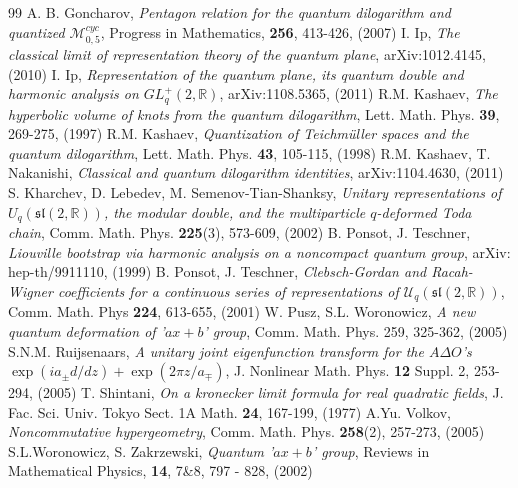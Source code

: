 \documentclass[10pt,reqno]{article}
\newcommand{\D}{\mathrm{D}}
\def\R{\mathbb{R}}
\def\cM{\mathcal{M}}
\def\cU{\mathcal{U}}
\def\D{\Delta}
\def\sl{\mathfrak{sl}}
\numberwithin{equation}{section}
\begin{document}
\begin{thebibliography}{99}
  A. B. Goncharov,
\textit{Pentagon relation for the quantum dilogarithm and quantized $\cM_{0,5}^{cyc}$},
Progress in Mathematics, \textbf{256}, 413-426, (2007)
  I. Ip,
  \textit{The classical limit of representation theory of the quantum plane},
   arXiv:1012.4145, (2010)
  I. Ip,
  \textit{Representation of the quantum plane, its quantum double and harmonic analysis on $GL_q^+(2,\R)$},
   arXiv:1108.5365, (2011) 
  R.M. Kashaev,
  \textit{The hyperbolic volume of knots from the quantum dilogarithm},
  Lett. Math. Phys. \textbf{39}, 269-275,  (1997)
  R.M. Kashaev,
  \textit{Quantization of Teichm\"{u}ller spaces and the quantum dilogarithm},
  Lett. Math. Phys. \textbf{43}, 105-115, (1998)
  R.M. Kashaev, T. Nakanishi,
 \textit{Classical and quantum dilogarithm identities},
 arXiv:1104.4630, (2011)
  S. Kharchev, D. Lebedev, M. Semenov-Tian-Shanksy,
  \textit{Unitary representations of $U_q(\sl(2,\R))$, the modular double, and the multiparticle $q$-deformed Toda chain},
  Comm. Math. Phys. \textbf{225}(3), 573-609, (2002)
  B. Ponsot, J. Teschner,
  \textit{Liouville bootstrap via harmonic analysis on a noncompact quantum group},
  arXiv: hep-th/9911110, (1999)
  B. Ponsot, J. Teschner,
  \textit{Clebsch-Gordan and Racah-Wigner coefficients for a continuous series of representations of $\cU_q(\mathfrak{sl}(2,\R))$},
  Comm. Math. Phys \textbf{224}, 613-655, (2001)
  W. Pusz, S.L. Woronowicz,
  \textit{A new quantum deformation of '$ax+b$' group},
  Comm. Math. Phys. 259, 325-362, (2005)
  S.N.M. Ruijsenaars,
  \textit{A unitary joint eigenfunction transform for the $A\D O$'s $\exp(ia_\pm d/dz)+\exp(2\pi z/a_\mp)$},
  J. Nonlinear Math. Phys. \textbf{12} Suppl. 2, 253-294, (2005)
  T. Shintani,
  \textit{On a kronecker limit formula for real quadratic fields},
J. Fac. Sci. Univ. Tokyo Sect. 1A Math. \textbf{24}, 167-199, (1977)
  A.Yu. Volkov,
  \textit{Noncommutative hypergeometry},
  Comm. Math. Phys. \textbf{258}(2), 257-273, (2005)
  S.L.Woronowicz, S. Zakrzewski,
  \textit{Quantum '$ax+b$' group},
  Reviews in Mathematical Physics, \textbf{14}, 7\&8, 797 - 828, (2002)
\end{thebibliography}
\end{document}
